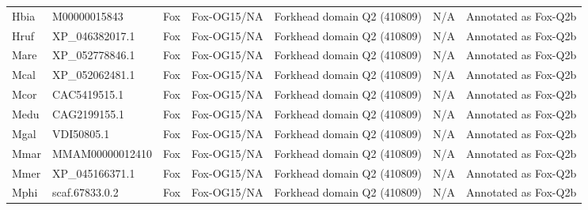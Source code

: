 \documentclass[../main.tex]{subfiles}
\begin{document}
\begin{landscape}
\begin{longtable}{lllllll}
		Hbia           & M00000015843          & Fox            & Fox-OG15/NA         & Forkhead domain Q2 (410809)                 & N/A                                                                    & Annotated as Fox-Q2b \\
		Hruf           & XP\_046382017.1       & Fox            & Fox-OG15/NA         & Forkhead domain Q2 (410809)                 & N/A                                                                    & Annotated as Fox-Q2b \\
		Mare           & XP\_052778846.1       & Fox            & Fox-OG15/NA         & Forkhead domain Q2 (410809)                 & N/A                                                                    & Annotated as Fox-Q2b \\
		Mcal           & XP\_052062481.1       & Fox            & Fox-OG15/NA         & Forkhead domain Q2 (410809)                 & N/A                                                                    & Annotated as Fox-Q2b \\
		Mcor           & CAC5419515.1          & Fox            & Fox-OG15/NA         & Forkhead domain Q2 (410809)                 & N/A                                                                    & Annotated as Fox-Q2b \\
		Medu           & CAG2199155.1          & Fox            & Fox-OG15/NA         & Forkhead domain Q2 (410809)                 & N/A                                                                    & Annotated as Fox-Q2b \\
		Mgal           & VDI50805.1            & Fox            & Fox-OG15/NA         & Forkhead domain Q2 (410809)                 & N/A                                                                    & Annotated as Fox-Q2b \\
		Mmar           & MMAM00000012410       & Fox            & Fox-OG15/NA         & Forkhead domain Q2 (410809)                 & N/A                                                                    & Annotated as Fox-Q2b \\
		Mmer           & XP\_045166371.1       & Fox            & Fox-OG15/NA         & Forkhead domain Q2 (410809)                 & N/A                                                                    & Annotated as Fox-Q2b \\
		Mphi           & scaf.67833.0.2        & Fox            & Fox-OG15/NA         & Forkhead domain Q2 (410809)                 & N/A                                                                    & Annotated as Fox-Q2b \\

\end{longtable}
\end{landscape}
\end{document}
